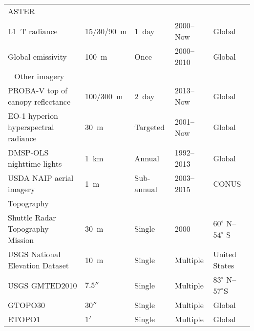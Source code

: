 \begin{table}[h]
\begin{tabularx}{\textwidth}{|l|X|X|X|X|}
		 ASTER	& & & & \\	
		 L1 T radiance	&15/30/90 m	&1 day&	2000–Now&	Global \\
		 Global emissivity	&100 m	&Once	&2000–2010&	Global \\
		  
		 Other imagery	& & & & \\		
		 PROBA-V top of canopy reflectance&	100/300 m&	2 day&	2013–Now&	Global\\
		 EO-1 hyperion hyperspectral radiance&	30 m&	Targeted&	2001–Now&	Global\\
		 DMSP-OLS nighttime lights&	1 km&	Annual&	1992–2013&	Global\\
		 USDA NAIP aerial imagery&	1 m	&Sub-annual	&2003–2015& 	CONUS\\
		 
		 Topography			& & & & \\		
		 Shuttle Radar Topography Mission&	30 m&	Single&	2000&	$60^\circ$ N–$54^\circ$ S\\
		 USGS National Elevation Dataset&	10 m&	Single&	Multiple&	United States\\
		 USGS GMTED2010&	$7.5''$&	Single	&Multiple&	$83^\circ$ N–$57^\circ$S\\
		 GTOPO30&	$30''$	&Single	&Multiple	&Global\\
		 ETOPO1	& $1'$ &	Single&	Multiple &	Global \\
		 

\end{tabularx}
\end{table}

